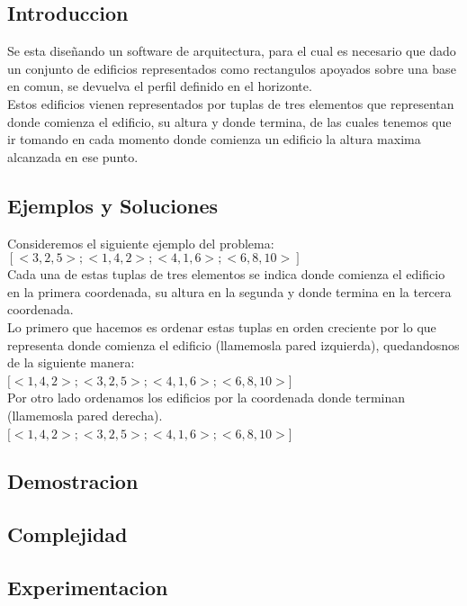 \subsection{Introduccion} 
Se esta diseñando un software de arquitectura, para el cual es necesario que dado un conjunto de edificios representados como rectangulos apoyados sobre una base en comun, se devuelva el perfil definido en el horizonte.\\
Estos edificios vienen representados por tuplas de tres elementos que representan donde comienza el edificio, su altura y donde termina, de las cuales tenemos que ir tomando en cada momento donde comienza un edificio la altura maxima alcanzada en ese punto.

 \subsection{Ejemplos y Soluciones}
 Consideremos el siguiente ejemplo del problema:\\
 $ [<3,2,5>;<1,4,2>;<4,1,6>;<6,8,10>]$ \\
  Cada una de estas tuplas de tres elementos se indica donde comienza el edificio en la primera coordenada, su altura en la segunda y donde termina en la tercera coordenada.\\
  
  Lo primero que hacemos es ordenar estas tuplas en orden creciente por lo que representa donde comienza el edificio (llamemosla pared izquierda), quedandosnos de la siguiente manera:\\ 
$[<1,4,2>;<3,2,5>;<4,1,6>;<6,8,10>$] \\

Por otro lado ordenamos los edificios por la coordenada donde terminan (llamemosla pared derecha).\\
$[<1,4,2>;<3,2,5>;<4,1,6>;<6,8,10>$] \\

\subsection{Demostracion}


\subsection{Complejidad}

\subsection{Experimentacion}

  



